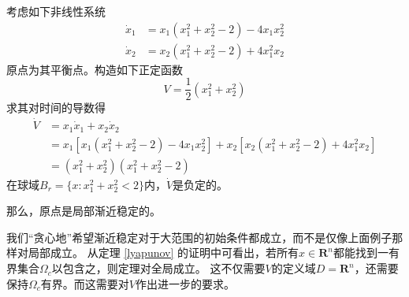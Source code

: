 \begin{example}[局部渐近稳定]
  考虑如下非线性系统\[\begin{aligned}\dot{x}_1&=x_1(x_1^2+x_2^2-2)-4x_1x_2^2\\\dot{x}_2&=x_2(x_1^2+x_2^2-2)+4x_1^2x_2\end{aligned}\]
  原点为其平衡点。构造如下正定函数\[V=\frac{1}{2}(x_1^2+x_2^2)\]
  求其对时间的导数得\[\begin{aligned}
    \dot{V}& =x_{1}\dot{x}_{1}+x_{2}\dot{x}_{2} \\
    &=x_{1}[x_{1}(x_{1}^{2}+x_{2}^{2}-2)-4x_{1}x_{2}^{2}]+x_{2}[x_{2}(x_{1}^{2}+x_{2}^{2}-2)+4x_{1}^{2}x_{2}] \\
    &=(x_1^2+x_2^2)(x_1^2+x_2^2-2)
    \end{aligned}\]
  在球域$B_r=\{x:x_1^2+x_2^2<2\}$内，$\dot{V}$是负定的。

  那么，原点是局部渐近稳定的。
\end{example}
我们“贪心地”希望渐近稳定对于大范围的初始条件都成立，而不是仅像上面例子那样对局部成立。
从定理 \ref{lyapunov} 的证明中可看出，若所有$x\in\mathbf{R}^n$都能找到一有界集合$\Omega_c$以包含之，则定理对全局成立。
这不仅需要$V$的定义域$D=\mathbf{R}^n$，还需要保持$\Omega_c$有界。而这需要对$V$作出进一步的要求。

